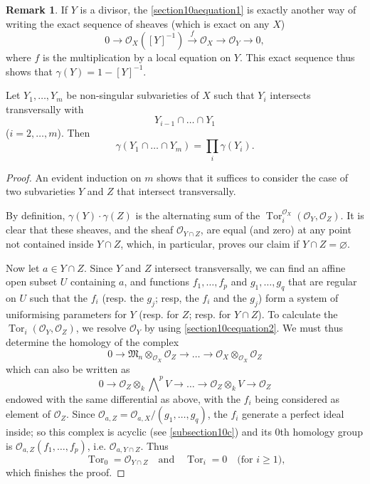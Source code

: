 \documentclass{article}
\theoremstyle{plain}
\newenvironment{proposition}[1]
    {\renewcommand\theinnercustomproposition{#1}\innercustomproposition}
    {\endinnercustomproposition}
\theoremstyle{definition}
\newtheorem*{remark}{Remark}
\newcommand{\sh}{\mathscr}
\renewcommand{\geq}{\geqslant}
\DeclareMathOperator{\Tor}{Tor}
\begin{document}
\begin{remark}
  If $Y$ is a divisor, the \cref{section10aequation1} is exactly another way of writing the exact sequence of sheaves (which is exact on any $X$)
  \[
  \label{equation3}
    0 \to \sh{O}_X([Y]^{-1}) \xrightarrow{f} \sh{O}_X \to \sh{O}_Y \to 0,
    \tag{3}
  \]
  where $f$ is the multiplication by a local equation on $Y$.
  This exact sequence thus shows that $\gamma(Y)=1-[Y]^{-1}$.
\end{remark}

\begin{proposition}{11}
\label{proposition11}
  Let $Y_1,\ldots,Y_m$ be non-singular subvarieties of $X$ such that $Y_i$ intersects transversally with
  \[
    Y_{i-1} \cap\ldots\cap Y_1
  \]
  ($i=2,\ldots,m$).
  Then
  \[
    \gamma(Y_1\cap\ldots\cap Y_m) = \prod_i\gamma(Y_i).
  \]
\end{proposition}

\begin{proof}
  An evident induction on $m$ shows that it suffices to consider the case of two subvarieties $Y$ and $Z$ that intersect transversally.

  By definition, $\gamma(Y)\cdot\gamma(Z)$ is the alternating sum of the $\Tor_i^{\sh{O}_X}(\sh{O}_Y,\sh{O}_Z)$.
  It is clear that these sheaves, and the sheaf $\sh{O}_{Y\cap Z}$, are equal (and zero) at any point not contained inside $Y\cap Z$, which, in particular, proves our claim if $Y\cap Z=\varnothing$.

  Now let $a\in Y\cap Z$.
  Since $Y$ and $Z$ intersect transversally, we can find an affine open subset $U$ containing $a$, and functions $f_1,\ldots,f_p$ and $g_1,\ldots,g_q$ that are regular on $U$ such that the $f_i$ (resp. the $g_j$; resp, the $f_i$ and the $g_j$) form a system of uniformising parameters for $Y$ (resp. for $Z$; resp. for $Y\cap Z$).
  To calculate the $\Tor_i(\sh{O}_Y,\sh{O}_Z)$, we resolve $\sh{O}_Y$ by using \cref{section10cequation2}.
  We must thus determine the homology of the complex
  \[
    0 \to \mathfrak{M}_n\otimes_{\sh{O}_X}\sh{O}_Z \to \ldots \to \sh{O}_X\otimes_{\sh{O}_X}\sh{O}_Z
  \]
  which can also be written as
  \[
    0 \to \sh{O}_Z\otimes_k\bigwedge\nolimits^p V \to \ldots \to \sh{O}_Z\otimes_k V \to \sh{O}_Z
  \]
  endowed with the same differential as above, with the $f_i$ being considered as element of $\sh{O}_Z$.
  Since $\sh{O}_{a,Z} = \sh{O}_{a,X}/(g_1,\ldots,g_q)$, the $f_i$ generate a perfect ideal inside;
  so this complex is acyclic (see \cref{subsection10c}) and its $0$th homology group is $\sh{O}_{a,Z}(f_1,\ldots,f_p)$, i.e. $\sh{O}_{a,Y\cap Z}$.
  Thus
  \[
    \Tor_0 = \sh{O}_{Y\cap Z}
    \quad\text{and}\quad
    \Tor_i = 0
    \quad\mbox{(for $i\geq1$),}
  \]
  which finishes the proof.
\end{proof}
\end{document}
